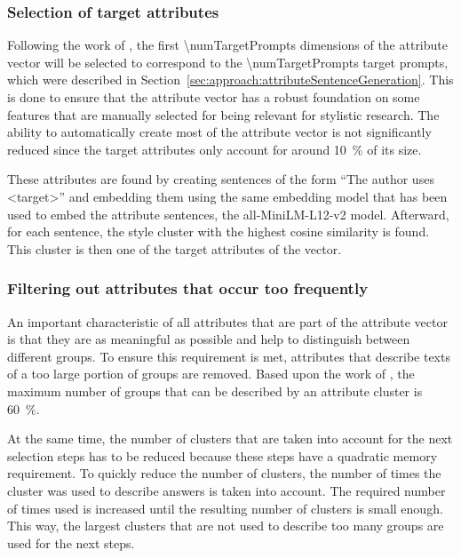 \subsubsection{Selection of target attributes}
\label{sec:experiments:setup:selection:targetAttributes}
Following the work of \citet{patelLearningInterpretableStyle2023}, the first \num{\numTargetPrompts} dimensions of the attribute vector will be selected to correspond to the \num{\numTargetPrompts} target prompts, which were described in Section~\ref{sec:approach:attributeSentenceGeneration}.
This is done to ensure that the attribute vector has a robust foundation on some features that are manually selected for being relevant for stylistic research. The ability to automatically create most of the attribute vector is not significantly reduced since the target attributes only account for around \SI{10}{\percent} of its size.

These attributes are found by creating sentences of the form \enquote{The author uses <target>} and embedding them using the same embedding model that has been used to embed the attribute sentences, the all-MiniLM-L12-v2 model.
Afterward, for each sentence, the style cluster with the highest cosine similarity is found. This cluster is then one of the target attributes of the vector.


\subsubsection{Filtering out attributes that occur too frequently}
\label{sec:experiments:setup:selection:filteringOccurance}
An important characteristic of all attributes that are part of the attribute vector is that they are as meaningful as possible and help to distinguish between different groups. To ensure this requirement is met, attributes that describe texts of a too large portion of groups are removed. Based upon the work of \citet{patelLearningInterpretableStyle2023}, the maximum number of groups that can be described by an attribute cluster is \SI{60}{\percent}.

At the same time, the number of clusters that are taken into account for the next selection steps has to be reduced because these steps have a quadratic memory requirement. To quickly reduce the number of clusters, the number of times the cluster was used to describe answers is taken into account. The required number of times used is increased until the resulting number of clusters is small enough. This way, the largest clusters that are not used to describe too many groups are used for the next steps.

